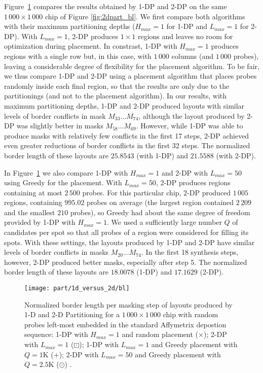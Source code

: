Figure~\ref{fig:1dp_versus_2dp} compares the results obtained by 1-DP and 2-DP
on the same $1\,000\times 1\,000$ chip of Figure \ref{fig:2dpart_bl}. We first
compare both algorithms with their maximum partitioning depths ($H_{max}=1$ for
1-DP and $L_{max}=1$ for 2-DP). With $L_{max}=1$, 2-DP produces $1\times 1$
regions and leaves no room for optimization during placement. In constrast, 1-DP
with $H_{max}=1$ produces regions with a single row but, in this case, with
$1\,000$ columns (and $1\,000$ probes), leaving a considerable degree of
flexibility for the placement algorithm. To be fair, we thus compare 1-DP and
2-DP using a placement algorithm that places probes randomly inside each final
region, so that the results are only due to the partitionings (and not to the
placement algorithm). In our results, with maximum partitioning depths, 1-DP and
2-DP produced layouts with similar levels of border conflicts in mask
$M_{33} \dots M_{74}$, although the layout produced by 2-DP was slightly better
in masks $M_{58} \dots M_{69}$. However, while 1-DP was able to produce masks
with relatively few conflicts in the first 17 steps, 2-DP achieved even greater
reductions of border conflicts in the first 32 steps. The normalized border
length of these layouts are $25.8543$ (with 1-DP) and $21.5588$ (with 2-DP).

In Figure~\ref{fig:1dp_versus_2dp} we also compare 1-DP with $H_{max}=1$ and
2-DP with $L_{max}=50$ using Greedy for the placement. With $L_{max}=50$, 2-DP
produces regions containing at most $2\,500$ probes. For this particular chip,
2-DP produced $1\,005$ regions, containing $995.02$ probes on average (the
largest region contained $2\,209$ and the smallest $210$ probes), so Greedy had
about the same degree of freedom provided by 1-DP with $H_{max}=1$. We used a
sufficiently large number $Q$ of candidates per spot so that all probes of a
region were considered for filling its spots. With these settings, the layouts
produced by 1-DP and 2-DP have similar levels of border conflicts in masks
$M_{20} \dots M_{74}$. In the first 18 synthesis steps, however, 2-DP produced
better masks, especially after step 5. The normalized border length of these
layouts are $18.0078$ (1-DP) and $17.1629$ (2-DP).

\begin{figure}[t]\centering
\texttt{[image: part/1d\_versus\_2d/bl]}
\caption{\label{fig:1dp_versus_2dp}
  Normalized border length per masking step of layouts produced by 1-D and 2-D
  Partitioning for a $1\,000\times 1\,000$ chip with random probes left-most
  embedded in the standard Affymetrix depostion sequence: 1-DP with $H_{max}=1$
  and random placement ({\scriptsize $\times$}); 2-DP with $L_{max}=1$
  ({\tiny $\boxdot$}); 1-DP with $L_{max}=1$ and Greedy placement with $Q=1$K
  ({\tiny $+$}); 2-DP with $L_{max}=50$ and Greedy placement with $Q=2.5$K
  ({\tiny $\odot$}) .}
\end{figure}

